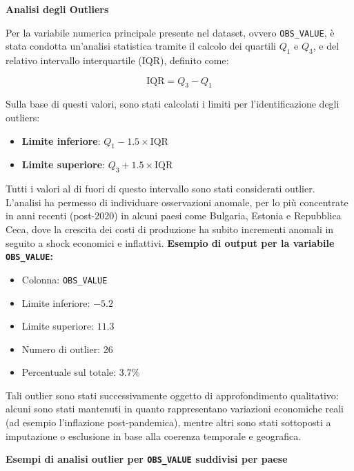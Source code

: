 \documentclass[conference]{IEEEtran}
\begin{document}
\vspace{0.2em}
\vspace{1em} \noindent\textbf{Analisi degli Outliers}

Per la variabile numerica principale presente nel dataset, ovvero \texttt{OBS\_VALUE}, è stata condotta un’analisi statistica tramite il calcolo dei quartili $Q_1$ e $Q_3$, e del relativo intervallo interquartile (IQR), definito come:

\[
\text{IQR} = Q_3 - Q_1
\]

Sulla base di questi valori, sono stati calcolati i limiti per l'identificazione degli outliers:

\begin{itemize}
  \item \textbf{Limite inferiore}: $Q_1 - 1.5 \times \text{IQR}$
  \item \textbf{Limite superiore}: $Q_3 + 1.5 \times \text{IQR}$
\end{itemize}

Tutti i valori al di fuori di questo intervallo sono stati considerati outlier. L’analisi ha permesso di individuare osservazioni anomale, per lo più concentrate in anni recenti (post-2020) in alcuni paesi come Bulgaria, Estonia e Repubblica Ceca, dove la crescita dei costi di produzione ha subito incrementi anomali in seguito a shock economici e inflattivi.
\newpage
\vspace{1em}\noindent\textbf{Esempio di output per la variabile \texttt{OBS\_VALUE}:}
\begin{itemize}
  \item Colonna: \texttt{OBS\_VALUE}
  \item Limite inferiore: $-5.2$
  \item Limite superiore: $11.3$
  \item Numero di outlier: 26
  \item Percentuale sul totale: 3.7\%
\end{itemize}

Tali outlier sono stati successivamente oggetto di approfondimento qualitativo: alcuni sono stati mantenuti in quanto rappresentano variazioni economiche reali (ad esempio l'inflazione post-pandemica), mentre altri sono stati sottoposti a imputazione o esclusione in base alla coerenza temporale e geografica.

\vspace{1em} \noindent\textbf{Esempi di analisi outlier per \texttt{OBS\_VALUE} suddivisi per paese}
\end{document}
